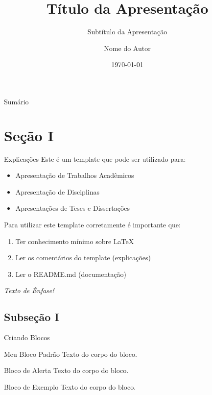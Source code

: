 \documentclass{ufc_format}
\title[short title]{\textbf{Título da Apresentação}}
\subtitle{Subtítulo da Apresentação}
\author{Nome do Autor}
\institute[UFC]{
    \ufc
}
\date{\today}
\begin{document}


\begin{frame}{}
    \maketitle
\end{frame}

\begin{frame}{Sumário}
    \tableofcontents
\end{frame}

\section{Seção I}
\begin{frame}{Explicações}
    Este é um template que pode ser utilizado para:
    \begin{itemize}
        \item Apresentação de Trabalhos Acadêmicos
        \item Apresentação de Disciplinas
        \item Apresentações de Teses e Dissertações
    \end{itemize}

    \vspace{0.4cm} %
    
    Para utilizar este template corretamente é importante que:
    \begin{enumerate}
        \item Ter conhecimento mínimo sobre LaTeX
        \item Ler os comentários do template (explicações)
        \item Ler o README.md (documentação)
    \end{enumerate}

    \vspace{0.2cm}

     \emph{Texto de Ênfase!}
\end{frame}

\subsection{Subseção I}
\begin{frame}{Criando Blocos}
    \begin{block}{Meu Bloco Padrão}
        Texto do corpo do bloco.
    \end{block}

    \begin{alertblock}{Bloco de Alerta}
        Texto do corpo do bloco.
    \end{alertblock}

    \begin{exampleblock}{Bloco de Exemplo}
        Texto do corpo do bloco.
    \end{exampleblock}   
\end{frame}
\end{document}
